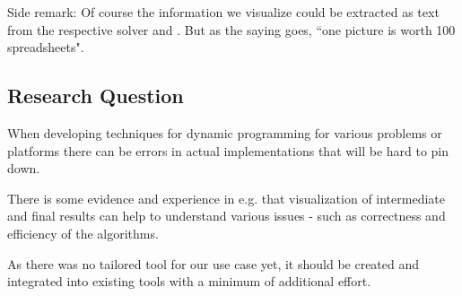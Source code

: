\documentclass[a4paper, 12pt, bibliography=totoc]{scrartcl}
\begin{document}
\vspace{2cm}
{\small{Side remark:}
	Of course the information we visualize could be extracted as text from the respective solver and . But as the saying goes, ``one picture is worth 100 spreadsheets". }
\newpage
\subsection{Research Question}
When developing techniques for dynamic programming for various problems or platforms there can be errors in actual implementations that will be hard to pin down. 

There is some evidence and experience in e.g. \cite{SoftwareVisualization, ELVIZ} that visualization of intermediate and final results can help to understand various issues - such as correctness and efficiency of the algorithms.

As there was no tailored tool for our use case yet, it should be created and integrated into existing tools with a minimum of additional effort.
\end{document}
